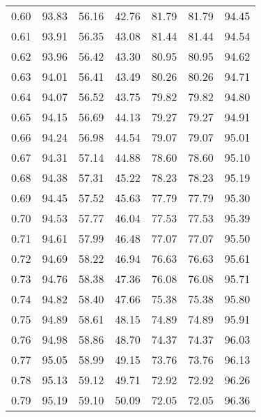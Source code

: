 \begin{tabular}{|c|c|c|c|c|c|c|}
      0.60 &     93.83 &     56.16 &      42.76 &   81.79 &      81.79 &         94.45 \\
      0.61 &     93.91 &     56.35 &      43.08 &   81.44 &      81.44 &         94.54 \\
      0.62 &     93.96 &     56.42 &      43.30 &   80.95 &      80.95 &         94.62 \\
      0.63 &     94.01 &     56.41 &      43.49 &   80.26 &      80.26 &         94.71 \\
      0.64 &     94.07 &     56.52 &      43.75 &   79.82 &      79.82 &         94.80 \\
      0.65 &     94.15 &     56.69 &      44.13 &   79.27 &      79.27 &         94.91 \\
      0.66 &     94.24 &     56.98 &      44.54 &   79.07 &      79.07 &         95.01 \\
      0.67 &     94.31 &     57.14 &      44.88 &   78.60 &      78.60 &         95.10 \\
      0.68 &     94.38 &     57.31 &      45.22 &   78.23 &      78.23 &         95.19 \\
      0.69 &     94.45 &     57.52 &      45.63 &   77.79 &      77.79 &         95.30 \\
      0.70 &     94.53 &     57.77 &      46.04 &   77.53 &      77.53 &         95.39 \\
      0.71 &     94.61 &     57.99 &      46.48 &   77.07 &      77.07 &         95.50 \\
      0.72 &     94.69 &     58.22 &      46.94 &   76.63 &      76.63 &         95.61 \\
      0.73 &     94.76 &     58.38 &      47.36 &   76.08 &      76.08 &         95.71 \\
      0.74 &     94.82 &     58.40 &      47.66 &   75.38 &      75.38 &         95.80 \\
      0.75 &     94.89 &     58.61 &      48.15 &   74.89 &      74.89 &         95.91 \\
      0.76 &     94.98 &     58.86 &      48.70 &   74.37 &      74.37 &         96.03 \\
      0.77 &     95.05 &     58.99 &      49.15 &   73.76 &      73.76 &         96.13 \\
      0.78 &     95.13 &     59.12 &      49.71 &   72.92 &      72.92 &         96.26 \\
      0.79 &     95.19 &     59.10 &      50.09 &   72.05 &      72.05 &         96.36 \\

\end{tabular}

